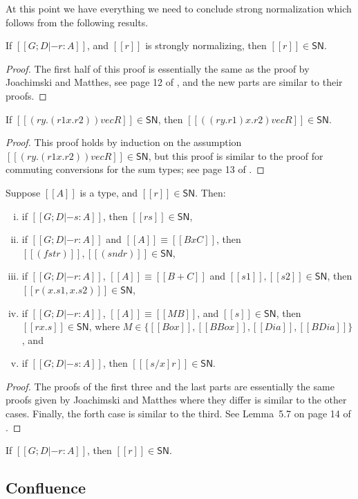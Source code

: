At this point we have everything we need to conclude strong
normalization which follows from the following results.
\begin{lemma}
  \label{lemma:all_strongly_normalizing_terms_are_in_SN}
  If $[[G;D |- r : A]]$, and $[[r]]$ is strongly normalizing, then $[[r]] \in \mathsf{SN}$.
\end{lemma}
\begin{proof}
  The first half of this proof is essentially the same as the proof by
  Joachimski and Matthes, see page 12 of \cite{Joachimski:2003}, and
  the new parts are similar to their proofs.
\end{proof}

\begin{lemma}
  \label{lemma:commuting_conversions_in_SN}
  If $[[(r y.(r1 x.r2)) vec R]] \in \mathsf{SN}$, then $[[((r y.r1) x.r2) vec R]] \in \mathsf{SN}$.
\end{lemma}
\begin{proof}
  This proof holds by induction on the assumption $[[(r y.(r1 x.r2))
      vec R]] \in \mathsf{SN}$, but this proof is similar to the proof
  for commuting conversions for the sum types; see page 13 of
  \cite{Joachimski:2003}.
\end{proof}

\begin{lemma}
  \label{lemma:typable_eliminations_are_in_SN}
  Suppose $[[A]]$ is a type, and $[[r]] \in \mathsf{SN}$.  Then:
  \begin{enumerate}[i.]
  \item if $[[G;D |- s : A]]$, then $[[r s]] \in \mathsf{SN}$,
  \item if $[[G;D |- r : A]]$ and $[[A]] \equiv [[B x C]]$, then $[[(fst r)]],[[(snd r)]] \in \mathsf{SN}$,
  \item if $[[G;D |- r : A]]$, $[[A]] \equiv [[B + C]]$ and $[[s1]],[[s2]] \in \mathsf{SN}$,
    then $[[r (x.s1,x.s2)]] \in \mathsf{SN}$,
  \item if $[[G;D |- r : A]]$, $[[A]] \equiv [[M B]]$, and $[[s]] \in \mathsf{SN}$, then $[[r x.s]] \in \mathsf{SN}$,
    where $M \in \{[[Box]], [[BBox]], [[Dia]], [[BDia]] \}$, and
  \item if $[[G;D |- s : A]]$, then $[[ [s/x]r]] \in \mathsf{SN}$.
  \end{enumerate}
\end{lemma}
\begin{proof}
  The proofs of the first three and the last parts are essentially the
  same proofs given by Joachimski and Matthes where they differ is
  similar to the other cases.  Finally, the forth case is similar to
  the third. See Lemma~5.7 on page 14 of \cite{Joachimski:2003}.
\end{proof}

\begin{corollary}
  \label{corollary:strong_normalization}
  If $[[G;D |- r : A]]$, then $[[r]] \in \mathsf{SN}$.
\end{corollary}


\subsection{Confluence}
\label{subsec:confluence}


